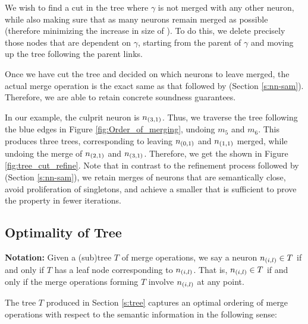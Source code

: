 We wish to find a cut in the tree where $\gamma$ is not merged with any other
neuron, while also making sure that as many neurons remain merged as possible
(therefore minimizing the increase in size of \abs). To do this, we delete
precisely those nodes that are dependent on $\gamma$, starting from the parent
of $\gamma$ and moving up the tree following the parent links.

Once we have cut the tree and decided on which neurons to leave merged, the
actual merge operation is the exact same as that followed by \cite{cegar-nn}
(Section \ref{s:nn-sam}). Therefore, we are able to retain concrete soundness
guarantees.

In our example, the culprit neuron is $n_{(3,1)}$. Thus, we traverse the tree
following the blue edges in Figure \ref{fig:Order_of_merging}, undoing $m_5$ and
$m_6$. This produces three trees, corresponding to leaving $n_{(0,1)}$ and
$n_{(1,1)}$ merged, while undoing the merge of $n_{(2,1)}$ and $n_{(3,1)}$.
Therefore, we get the \abs shown in Figure \ref{fig:tree_cut_refine}. Note
that in contrast to the refinement process followed by \cite{cegar-nn} (Section
\ref{s:nn-sam}), we retain merges of neurons that are semantically close, avoid
proliferation of singletons, and achieve a smaller \abs that is sufficient to
prove the property in fewer iterations.



\subsection{Optimality of Tree}
\label{s:optimal-tree}

\textbf{Notation:} Given a (sub)tree $T$ of
merge operations, we say a neuron $n_{(i,l)} \in T$ if and only if $T$ has a
leaf node corresponding to $n_{(i,l)}$. That is, $n_{(i,l)} \in T$ if and only
if the merge operations forming $T$ involve $n_{(i,l)}$ at any point.

The tree $T$ produced in Section \ref{s:tree} captures an optimal ordering of
merge operations with respect to the semantic information in the following
sense:

